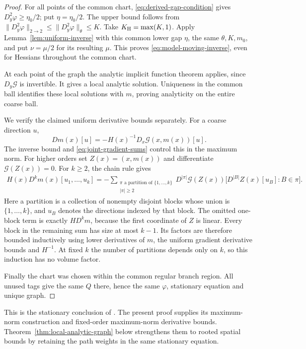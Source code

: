\documentclass[11pt,reqno]{amsart}
\numberwithin{equation}{section}
\theoremstyle{definition}
\theoremstyle{remark}
\begin{document}
\begin{proof}
For all points of the common chart,
\eqref{eq:derived-gap-condition} gives
\(D_y^2\varphi\ge\eta_0/2\); put \(\eta=\eta_0/2\).
The upper bound follows from
\(\|D_y^2\varphi\|_{2\to2}\le\|D_y^2\varphi\|_\theta\le K\).
Take \(K_{\rm H}=\max(K,1)\).
Apply Lemma~\ref{lem:uniform-inverse} with this common lower
gap \(\eta\), the same \(\theta,K,m_0\), and put \(\nu=\mu/2\)
for its resulting \(\mu\). This proves
\eqref{eq:model-moving-inverse}, even for Hessians throughout
the common chart.

At each point of the graph the analytic implicit function
theorem applies, since \(D_y\mathcal G\) is invertible.
It gives a local analytic solution. Uniqueness in the common
ball identifies these local solutions with \(m\), proving
analyticity on the entire coarse ball.

We verify the claimed uniform derivative bounds separately.
For a coarse direction \(u\),
\[
       Dm(x)[u]
          =-H(x)^{-1}D_x\mathcal G(x,m(x))[u].
\]
The inverse bound and \eqref{eq:joint-gradient-sums} control this
in the maximum norm. For higher orders set
\(Z(x)=(x,m(x))\) and differentiate
\(\mathcal G(Z(x))=0\). For \(k\ge2\), the chain rule gives
\begin{equation}
 \begin{split}
 H(x)D^km(x)[u_1,\ldots,u_k]
   =-\sum_{\substack{\pi\text{ a partition of }\{1,\ldots,k\}\\
                      |\pi|\ge2}}
       D^{|\pi|}\mathcal G(Z(x))
          \bigl[D^{|B|}Z(x)[u_B]:B\in\pi\bigr].
 \end{split}
 \label{eq:model-graph-derivative-recursion}
\end{equation}
Here a partition is a collection of nonempty disjoint blocks
whose union is \(\{1,\ldots,k\}\), and \(u_B\) denotes the
directions indexed by that block. The omitted one-block term
is exactly \(H D^km\), because the first coordinate
of \(Z\) is linear. Every block in the remaining sum has size
at most \(k-1\). Its factors are therefore bounded inductively
using lower derivatives of \(m\), the uniform gradient
derivative bounds and \(H^{-1}\). At fixed \(k\) the
number of partitions depends only on \(k\), so this induction
has no volume factor.

Finally the chart was chosen within the common regular branch
region. All unused tags give the same \(Q\) there, hence the
same \(\varphi\), stationary equation and unique graph.
\end{proof}

This is the stationary conclusion of
\cite[Theorem~14.17 and (14.39)--(14.40), p.~73]{Main}.
The present proof supplies its maximum-norm construction and
fixed-order maximum-norm derivative bounds.
Theorem~\ref{thm:local-analytic-graph} below strengthens them to
rooted spatial bounds by retaining the path weights in the
same stationary equation.
\end{document}
